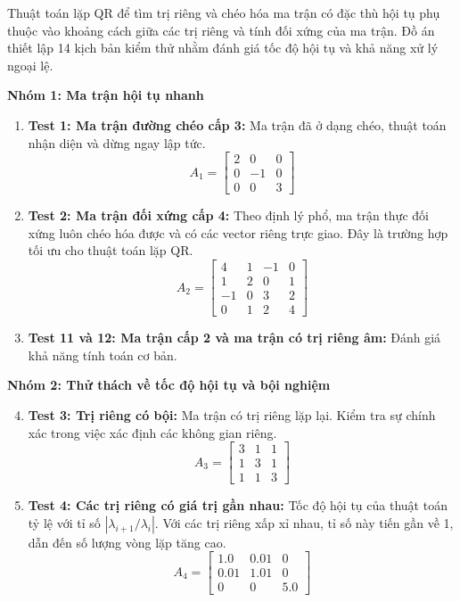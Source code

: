 Thuật toán lặp QR để tìm trị riêng và chéo hóa ma trận có đặc thù hội tụ phụ thuộc vào khoảng cách giữa các trị riêng và tính đối xứng của ma trận. Đồ án thiết lập 14 kịch bản kiểm thử nhằm đánh giá tốc độ hội tụ và khả năng xử lý ngoại lệ.

\textbf{Nhóm 1: Ma trận hội tụ nhanh}
\begin{enumerate}
    \item \textbf{Test 1: Ma trận đường chéo cấp 3:} Ma trận đã ở dạng chéo, thuật toán nhận diện và dừng ngay lập tức.
    $$ A_1 = \begin{bmatrix} 2 & 0 & 0 \\ 0 & -1 & 0 \\ 0 & 0 & 3 \end{bmatrix} $$

    \item \textbf{Test 2: Ma trận đối xứng cấp 4:} Theo định lý phổ, ma trận thực đối xứng luôn chéo hóa được và có các vector riêng trực giao. Đây là trường hợp tối ưu cho thuật toán lặp QR.
    $$ A_2 = \begin{bmatrix} 4 & 1 & -1 & 0 \\ 1 & 2 & 0 & 1 \\ -1 & 0 & 3 & 2 \\ 0 & 1 & 2 & 4 \end{bmatrix} $$

    \item \textbf{Test 11 và 12: Ma trận cấp 2 và ma trận có trị riêng âm:} Đánh giá khả năng tính toán cơ bản.
\end{enumerate}

\textbf{Nhóm 2: Thử thách về tốc độ hội tụ và bội nghiệm}
\begin{enumerate}
    \setcounter{enumi}{3}
    \item \textbf{Test 3: Trị riêng có bội:} Ma trận có trị riêng lặp lại. Kiểm tra sự chính xác trong việc xác định các không gian riêng.
    $$ A_3 = \begin{bmatrix} 3 & 1 & 1 \\ 1 & 3 & 1 \\ 1 & 1 & 3 \end{bmatrix} $$

    \item \textbf{Test 4: Các trị riêng có giá trị gần nhau:} Tốc độ hội tụ của thuật toán tỷ lệ với tỉ số $|\lambda_{i+1} / \lambda_i|$. Với các trị riêng xấp xỉ nhau, tỉ số này tiến gần về 1, dẫn đến số lượng vòng lặp tăng cao.
    $$ A_4 = \begin{bmatrix} 1.0 & 0.01 & 0 \\ 0.01 & 1.01 & 0 \\ 0 & 0 & 5.0 \end{bmatrix} $$
\end{enumerate}

